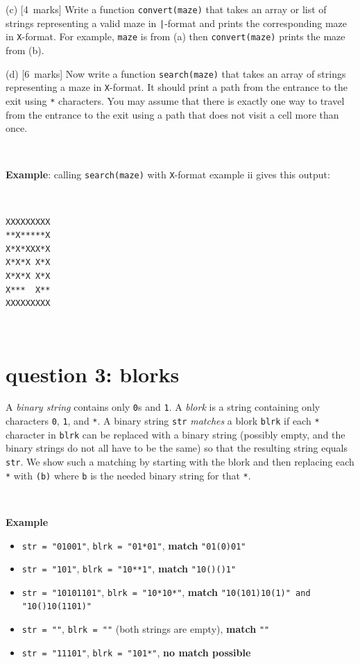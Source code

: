 \documentclass[12pt]{article}
\newcommand{\mymarks}[1]{\mbox{\small [#1 marks]}}
\begin{document}
(c) \mymarks{4}
Write a function \texttt{convert(maze)} that takes an array or list of strings representing a valid maze in \verb&|&-format and 
prints the corresponding maze in \verb&X&-format. 
For example, \texttt{maze} is from (a) then
\texttt{convert(maze)} prints the maze from (b).

\vfill

(d) \mymarks{6}
Now write a function \verb&search(maze)& 
that takes an array of strings representing a maze in \verb&X&-format.
It should print a path from the entrance to the exit using 
\verb&*& characters. 
You may assume that there is exactly one way to travel from the entrance
to the exit using a path that does not visit a cell more than once.

~

\noindent
\begin{minipage}[c]{13cm}
{\bf Example}: calling \texttt{search(maze)} with \verb&X&-format 
example ii gives this output:
\end{minipage}~ ~ ~
\begin{minipage}[c]{4cm}
{\small\begin{verbatim}
XXXXXXXXX
**X*****X
X*X*XXX*X
X*X*X X*X
X*X*X X*X
X***  X**
XXXXXXXXX
\end{verbatim}}
\end{minipage}
\vfill~


\newpage
\section*{question 3: blorks}

A {\em binary string} contains only \verb&0&s and \verb&1&.
A {\em blork} is a string containing only characters \verb&0&, \verb&1&, and \verb&*&. 
A binary string \verb&str& {\em matches} a blork \verb&blrk&
if each \verb&*& character in \verb&blrk& 
can be replaced with a binary string (possibly empty, and the
binary strings do not all have to be the same)
so that the resulting string equals \verb&str&. 
We show such a matching by 
starting with the blork and then
replacing each \verb&*& with \verb&(b)& where \verb&b& is
the needed binary string for that \verb&*&.

~

\noindent
{\bf Example}
\begin{itemize}
\item \verb&str = "01001"&, \verb&blrk = "01*01"&,
{\bf match} \verb&"01(0)01"&
\item \verb&str = "101"&, \verb&blrk = "10**1"&, 
{\bf match} \verb&"10()()1"&
\item \verb&str = "10101101"&, \verb&blrk = "10*10*"&, 
{\bf match} \verb&"10(101)10(1)" and "10()10(1101)"&
\item \verb&str = ""&, \verb&blrk = ""& (both strings are empty), 
{\bf match} \verb&""&
\item \verb&str = "11101"&, \verb&blrk = "101*"&, {\bf no match possible}
\end{itemize}
\end{document}
